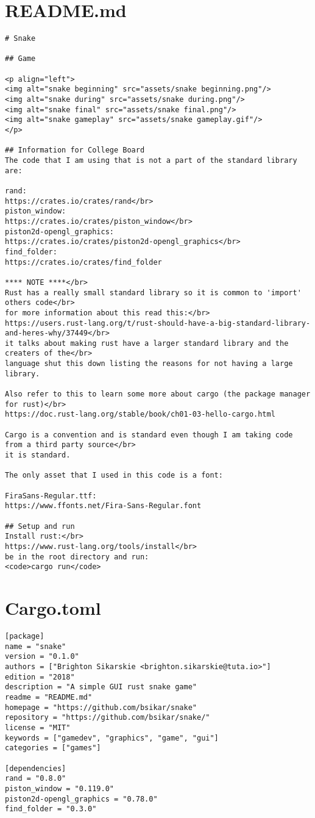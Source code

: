 \documentclass{article}
\begin{document}
\section{README.md}
\begin{verbatim}
# Snake

## Game

<p align="left">
<img alt="snake beginning" src="assets/snake beginning.png"/>
<img alt="snake during" src="assets/snake during.png"/>
<img alt="snake final" src="assets/snake final.png"/>
<img alt="snake gameplay" src="assets/snake gameplay.gif"/>
</p>

## Information for College Board
The code that I am using that is not a part of the standard library are:

rand:
https://crates.io/crates/rand</br>
piston_window:
https://crates.io/crates/piston_window</br>
piston2d-opengl_graphics:
https://crates.io/crates/piston2d-opengl_graphics</br>
find_folder:
https://crates.io/crates/find_folder

**** NOTE ****</br>
Rust has a really small standard library so it is common to 'import' others code</br>
for more information about this read this:</br>
https://users.rust-lang.org/t/rust-should-have-a-big-standard-library-and-heres-why/37449</br>
it talks about making rust have a larger standard library and the creaters of the</br>
language shut this down listing the reasons for not having a large library.

Also refer to this to learn some more about cargo (the package manager for rust)</br>
https://doc.rust-lang.org/stable/book/ch01-03-hello-cargo.html

Cargo is a convention and is standard even though I am taking code from a third party source</br>
it is standard.

The only asset that I used in this code is a font:

FiraSans-Regular.ttf:
https://www.ffonts.net/Fira-Sans-Regular.font

## Setup and run
Install rust:</br>
https://www.rust-lang.org/tools/install</br>
be in the root directory and run:
<code>cargo run</code>
\end{verbatim}

\section{Cargo.toml}
\begin{verbatim}
[package]
name = "snake"
version = "0.1.0"
authors = ["Brighton Sikarskie <brighton.sikarskie@tuta.io>"]
edition = "2018"
description = "A simple GUI rust snake game"
readme = "README.md"
homepage = "https://github.com/bsikar/snake"
repository = "https://github.com/bsikar/snake/"
license = "MIT"
keywords = ["gamedev", "graphics", "game", "gui"]
categories = ["games"]

[dependencies]
rand = "0.8.0"
piston_window = "0.119.0"
piston2d-opengl_graphics = "0.78.0"
find_folder = "0.3.0"
\end{verbatim}
\end{document}
